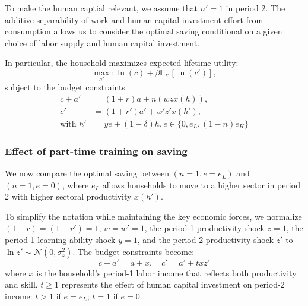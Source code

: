 \documentclass[12pt]{article}
\begin{document}
To make the human captial relevant, we assume that $n'=1$ in period 2. The additive separability of work and human capital investment effort from consumption allows us to consider the optimal saving conditional on a given choice of labor supply and human capital investment. 

In particular, the household maximizes expected lifetime utility:   
\begin{equation}\label{eq:savingprob}
\max_{a'} : \ln(c) + \beta \mathbb{E}_{z'}[\ln(c')],
\end{equation}
subject to the budget constraints
\begin{align}
c + a' &= (1+r)a + n(wzx(h)) , \\
c' &= (1+r')a' + w'z'x(h'), \\
\text{with } h' &= ye + (1-\delta)h, e \in \{0, e_L, (1-n)e_H\}
\end{align}

\subsubsection{Effect of part-time training on saving}\label{sec:part-time-saving}
We now compare the optimal saving between $(n=1,e=e_L)$ and $(n=1,e=0)$, where $e_L$ allows households to move to a higher sector in period 2 with higher sectoral productivity $x(h')$. 

To simplify the notation while maintaining the key economic forces, we normalize $(1+r)=(1+r')= 1$, $w=w'= 1$, the period-1 productivity shock $z=1$, the period-1 learning-ability shock $y=1$, and the period-2 productivity shock $z'$ to $\ln z' \sim \mathcal{N}(0,\sigma_z^2)$. The budget constraints become:
\begin{equation}
c + a' = a + x , \quad c' = a' + txz'
\end{equation}
where $x$ is the household's period-1 labor income that reflects both productivity and skill. $t\geq 1$ represents the effect of human capital investment on period-2 income: $t>1$ if $e=e_L$; $t=1$ if $e=0$.
\end{document}
